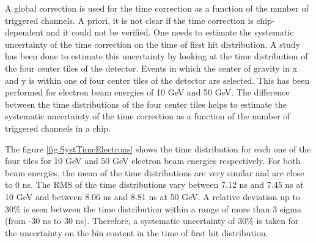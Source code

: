 A global correction is used for the time correction as a function of the number of triggered channels. A priori, it is not clear if the time correction is chip-dependent and it could not be verified. One needs to estimate the systematic uncertainty of the time correction on the time of first hit distribution. A study has been done to estimate this uncertainty by looking at the time distribution of the four center tiles of the detector. Events in which the center of gravity in x and y is within one of four center tiles of the detector are selected. This has been performed for electron beam energies of 10 GeV and 50 GeV. The difference between the time distributions of the four center tiles helps to estimate the systematic uncertainty of the time correction as a function of the number of triggered channels in a chip.

The figure \ref{fig:SystTimeElectrons} shows the time distribution for each one of the four tiles for 10 GeV and 50 GeV electron beam energies respectively. For both beam energies, the mean of the time distributions are very similar and are close to 0 ns. The RMS of the time distributions vary between 7.12 ns and 7.45 ns at 10 GeV and between 8.06 ns and 8.81 ns at 50 GeV. A relative deviation up to 30\% is seen between the time distribution within a range of more than 3 sigma (from -30 ns to 30 ns). Therefore, a systematic uncertainty of 30\% is taken for the uncertainty on the bin content in the time of first hit distribution.


